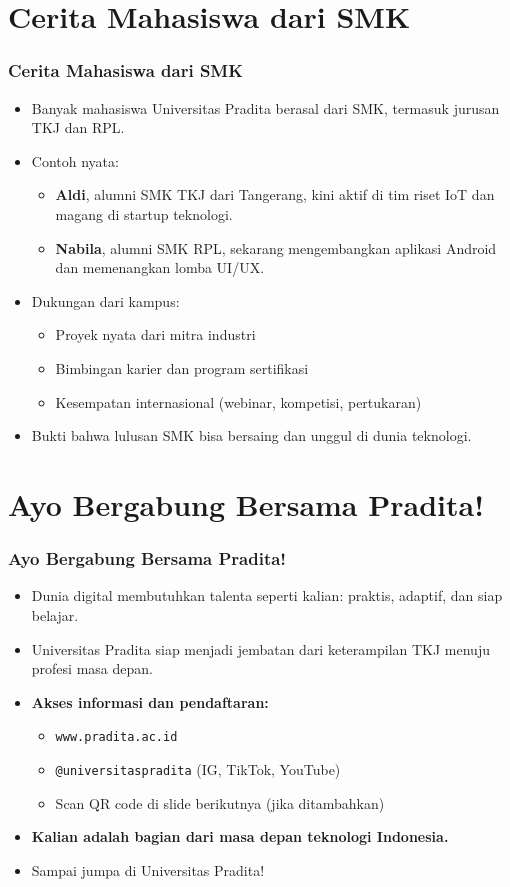 \documentclass[aspectratio=169, table]{beamer}
\begin{document}
\section{Cerita Mahasiswa dari SMK}
\begin{frame}
	\frametitle{Cerita Mahasiswa dari SMK}
	\vspace{10pt}
	\begin{itemize}
		\item Banyak mahasiswa Universitas Pradita berasal dari SMK, termasuk jurusan TKJ dan RPL.
		\item Contoh nyata:
		\begin{itemize}
			\item \textbf{Aldi}, alumni SMK TKJ dari Tangerang, kini aktif di tim riset IoT dan magang di startup teknologi.
			\item \textbf{Nabila}, alumni SMK RPL, sekarang mengembangkan aplikasi Android dan memenangkan lomba UI/UX.
		\end{itemize}
		\item Dukungan dari kampus:
		\begin{itemize}
			\item Proyek nyata dari mitra industri
			\item Bimbingan karier dan program sertifikasi
			\item Kesempatan internasional (webinar, kompetisi, pertukaran)
		\end{itemize}
		\item Bukti bahwa lulusan SMK bisa bersaing dan unggul di dunia teknologi.
	\end{itemize}
\end{frame}

\section{Ayo Bergabung Bersama Pradita!}
\begin{frame}
	\frametitle{Ayo Bergabung Bersama Pradita!}
	\vspace{10pt}
	\begin{itemize}
		\item Dunia digital membutuhkan talenta seperti kalian: praktis, adaptif, dan siap belajar.
		\item Universitas Pradita siap menjadi jembatan dari keterampilan TKJ menuju profesi masa depan.
		\item \textbf{Akses informasi dan pendaftaran:}
		\begin{itemize}
			\item \texttt{www.pradita.ac.id}
			\item \texttt{@universitaspradita} (IG, TikTok, YouTube)
			\item Scan QR code di slide berikutnya (jika ditambahkan)
		\end{itemize}
		\item \textbf{Kalian adalah bagian dari masa depan teknologi Indonesia.}
		\item Sampai jumpa di Universitas Pradita!
	\end{itemize}
\end{frame}
\end{document}
